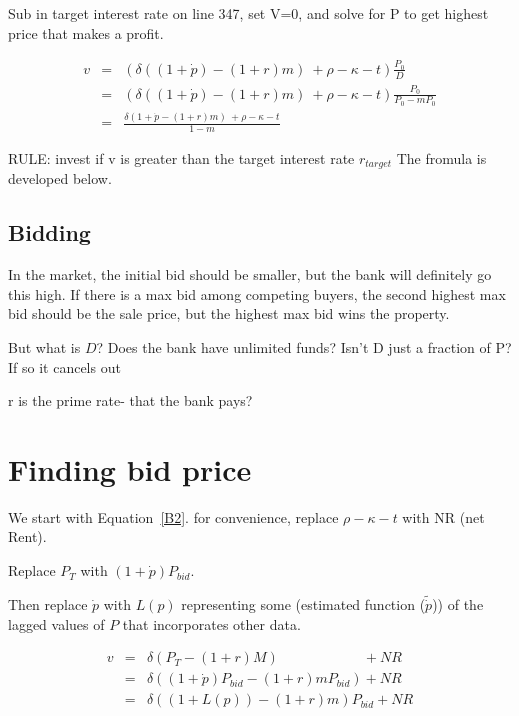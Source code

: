 Sub in target interest rate on line 347,  set V=0, and solve for P to get highest price that makes a profit.

\begin{eqnarray}
v&=&( \delta((1+\dot p)  - (1+r)m) \ + \rho   	-\kappa - t ) \frac{P_0}{D}   \nonumber\\
		&=&( \delta((1+\dot p)  - (1+r)m) \ + \rho   	-\kappa - t ) \frac{P_0}{P_0-mP_0}   \nonumber\\
		&=&\frac{ \delta(1+\dot p  - (1+r)m) \ + \rho   	-\kappa - t } {1-m} \label{Eqn:DecisionRule}
\end{eqnarray}

RULE: invest if v is greater than  the  target interest rate $r_{target}$            The fromula is developed below.

\subsection{Bidding}

In the market, the initial bid should be smaller, but the bank will definitely go this high. If there is a  max bid among competing buyers, the second highest max bid should be the sale price, but the highest max bid wins the property.

But what is $D$? Does the bank have unlimited funds? Isn't D just a fraction of P?  If so it cancels out



r is the prime rate- that the bank pays? 


\section{Finding bid price}
We start with Equation~\ref{B2}. for convenience, replace $\rho   	-\kappa - t $ with NR (net Rent). 

Replace $P_T$ with $(1+\dot p)P_{bid}$.

Then replace   $\dot p$ with $L(p)$ representing some (estimated function ($\tilde{\dot p}$)) of the lagged values of $P$ that incorporates other data. 

\begin{eqnarray}
v&=& \delta(P_T- (1+r)M) \qquad \qquad \qquad 	 + NR \nonumber\\
 &=&\delta\left( (1+\dot p)P_{bid} - (1+r)mP_{bid} \right)  + NR  \nonumber\\
  &=&\delta\left( (1+L(p)) - (1+r)m \right) P_{bid} + NR  \nonumber
\end{eqnarray}


